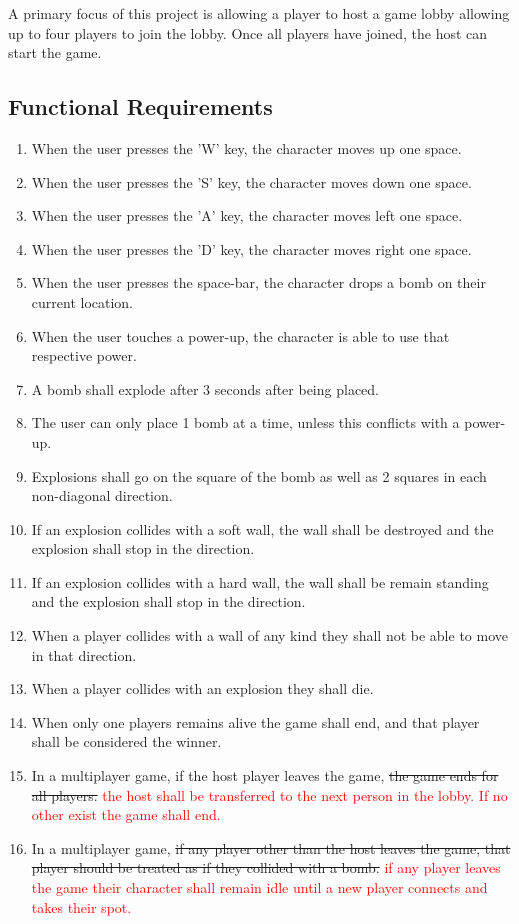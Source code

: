 \documentclass[12pt, titlepage]{article}
\begin{document}
A primary focus of this project is allowing a player to host a game lobby allowing up to four players to join the lobby. Once all players have joined, the host can start the game.

\subsection{Functional Requirements}
\begin{enumerate}[{FR}1. ]
    \item When the user presses the 'W' key, the character moves up one space.
    \item When the user presses the 'S' key, the character moves down one space.
    \item When the user presses the 'A' key, the character moves left one space.
    \item When the user presses the 'D' key, the character moves right one space.
    \item When the user presses the space-bar, the character drops a bomb on their current location.
    \item When the user touches a power-up, the character is able to use that respective power.
    \item A bomb shall explode after 3 seconds after being placed.
    \item The user can only place 1 bomb at a time, unless this conflicts with a power-up.
    \item Explosions shall go on the square of the bomb as well as 2 squares in each non-diagonal direction.
    \item If an explosion collides with a soft wall, the wall shall be destroyed and the explosion shall stop in the direction.
    \item If an explosion collides with a hard wall, the wall shall be remain standing and the explosion shall stop in the direction.
    \item When a player collides with a wall of any kind they shall not be able to move in that direction.
    \item When a player collides with an explosion they shall die.
    \item When only one players remains alive the game shall end, and that player shall be considered the winner.
    \item In a multiplayer game, if the host player leaves the game, \st{the game ends for all players.} \textcolor{red}{the host shall be transferred to the next person in the lobby. If no other exist the game shall end.}
    \item In a multiplayer game, \st{if any player other than the host leaves the game, that player should be treated as if they collided with a bomb.} \textcolor{red}{if any player leaves the game their character shall remain idle until a new player connects and takes their spot.}

    
\end{enumerate}
\end{document}
